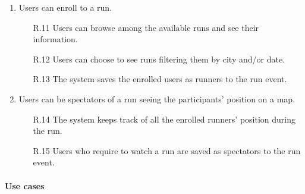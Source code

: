 \documentclass[a4paper]{article}
\begin{document}
\begin{enumerate}[label*=\bf{G.\arabic*}]
        \item Users can enroll to a run.
        
        \begin{enumerate}
            \item [R.11] Users can browse among the available runs and see their information.
            \item [R.12] Users can choose to see runs filtering them by city and/or date. 
            \item [R.13] The system saves the enrolled users as runners to the run event.
        \end{enumerate}
        
        \item Users can be spectators of a run seeing the participants' position on a map.
        
        \begin{enumerate}
            \item [R.14] The system keeps track of all the enrolled runners' position during the run.
            \item [R.15] Users who require to watch a run are saved as spectators to the run event.
        \end{enumerate}
        
    \end{enumerate}
    
    
    \paragraph{Use cases}
    
\end{document}

